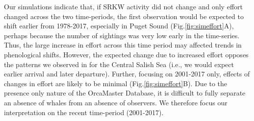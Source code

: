 \documentclass{article}
\begin{document}
\par Our simulations indicate that, if SRKW activity did not change and only effort changed across the two time-periods, the first observation would be expected to shift earlier from 1978-2017, especially in Puget Sound (Fig.\ref{fig:simeffort}A), perhaps because the number of sightings was very low early in the time-series. Thus, the large increase in effort across this time period may affected trends in phenological shifts.  However, the expected change due to increased effort opposes the patterns we observed in for the Central Salish Sea (i.e., we would expect earlier arrival and later departure). Further, focusing on 2001-2017 only, effects of changes in effort are likely to be minimal (Fig.\ref{fig:simeffort}B). Due to the presence only nature of the OrcaMaster Database, it is difficult to fully separate an absence of whales from an absence of observers. We therefore focus our interpretation on the recent time-period (2001-2017).



\end{document}
